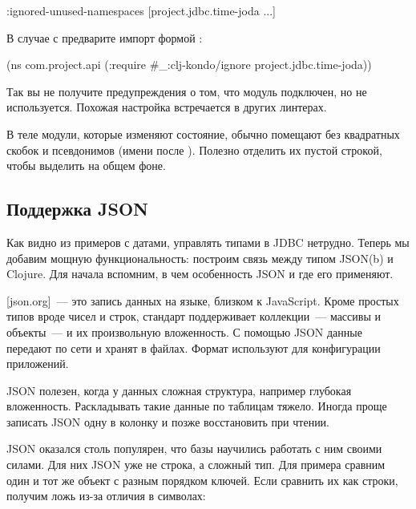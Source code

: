 \begin{english}
  \begin{clojure}
{:ignored-unused-namespaces
   [project.jdbc.time-joda
    ...]}
  \end{clojure}
\end{english}

В случае с  предварите импорт формой :

\begin{english}
  \begin{clojure}
(ns com.project.api
  (:require
    #_:clj-kondo/ignore project.jdbc.time-joda))
  \end{clojure}
\end{english}

Так вы не получите предупреждения о том, что модуль  подключен, но не используется. Похожая настройка встречается в других линтерах.

В теле  модули, которые изменяют состояние, обычно помещают без квадратных скобок и псевдонимов (имени после ). Полезно отделить их пустой строкой, чтобы выделить на общем фоне.

\subsection{Поддержка JSON}

Как видно из примеров с датами, управлять типами в JDBC нетрудно. Теперь мы добавим мощную функциональность: построим связь между типом JSON(b) и Clojure. Для начала вспомним, в чем особенность JSON и где его применяют.

\def\urljsonorg{https://www.json.org/json-en.html}

\footurl{JSON}{\urljsonorg}[json.org]~--- это запись данных на языке, близком к JavaScript. Кроме простых типов вроде чисел и строк, стандарт поддерживает коллекции~--- массивы и объекты~--- и их произвольную вложенность. С помощью JSON данные передают по сети и хранят в файлах. Формат используют для конфигурации приложений.

JSON полезен, когда у данных сложная структура, например глубокая вложенность. Раскладывать такие данные по таблицам тяжело. Иногда проще записать JSON одну в колонку и позже восстановить при чтении.

JSON оказался столь популярен, что базы научились работать с ним своими силами. Для них JSON уже не строка, а сложный тип. Для примера сравним один и тот же объект с разным порядком ключей. Если сравнить их как строки, получим ложь из-за отличия в символах:

